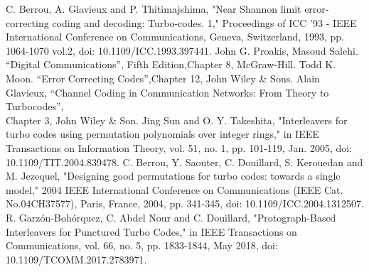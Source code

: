 \begin{thebibliography}{99}
  C. Berrou, A. Glavieux and P. Thitimajshima, "Near Shannon limit error-correcting coding and decoding: Turbo-codes. 1," Proceedings of ICC '93 - IEEE International Conference on Communications, Geneva, Switzerland, 1993, pp. 1064-1070 vol.2, doi: 10.1109/ICC.1993.397441.
 John G. Proakis, Masoud Salehi. ``Digital Communications'', 
Fifth Edition,Chapter 8, McGraw-Hill.
 Todd K. Moon. ``Error Correcting Codes'',Chapter 12, John Wiley \& Sons.
Alain Glavieux, ``Channel Coding in Communication Networks: From Theory to Turbocodes'',\\ Chapter 3, John Wiley \& Son. 
 Jing Sun and O. Y. Takeshita, "Interleavers for turbo codes using permutation polynomials over integer rings," in IEEE Transactions on Information Theory, vol. 51, no. 1, pp. 101-119, Jan. 2005, doi: 10.1109/TIT.2004.839478.
 C. Berrou, Y. Saouter, C. Douillard, S. Kerouedan and M. Jezequel, "Designing good permutations for turbo codes: towards a single model," 2004 IEEE International Conference on Communications (IEEE Cat. No.04CH37577), Paris, France, 2004, pp. 341-345, doi: 10.1109/ICC.2004.1312507.
R. Garzón-Bohórquez, C. Abdel Nour and C. Douillard, "Protograph-Based Interleavers for Punctured Turbo Codes," in IEEE Transactions on Communications, vol. 66, no. 5, pp. 1833-1844, May 2018, doi: 10.1109/TCOMM.2017.2783971.
\end{thebibliography}